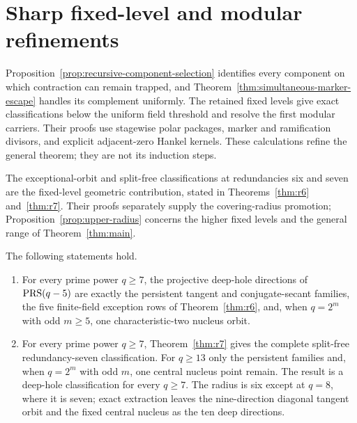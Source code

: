 \section{Sharp fixed-level and modular refinements}
\label{sec:fixed-level-roadmap}

Proposition~\ref{prop:recursive-component-selection} identifies every
component on which contraction can remain trapped, and
Theorem~\ref{thm:simultaneous-marker-escape} handles its complement uniformly.
The retained fixed levels give exact classifications below the uniform field
threshold and resolve the first modular carriers.  Their proofs use stagewise polar
packages, marker and ramification divisors, and explicit adjacent-zero Hankel
kernels.  These calculations refine the general theorem; they are not its
induction steps.

The exceptional-orbit and split-free classifications at redundancies six and
seven are the fixed-level geometric contribution, stated in
Theorems~\ref{thm:r6} and~\ref{thm:r7}.  Their proofs separately supply the
covering-radius promotion; Proposition~\ref{prop:upper-radius} concerns the
higher fixed levels and the general range of Theorem~\ref{thm:main}.

\begin{theorem}
\label{thm:spine}%
%
%
%
The following statements hold.
\begin{enumerate}[label=\textup{(\alph*)}]
\item For every prime power $q\geq7$, the projective deep-hole
      directions of $\operatorname{PRS}(q-5)$ are exactly the persistent tangent and
      conjugate-secant families, the five finite-field exception rows of
      Theorem~\ref{thm:r6}, and, when $q=2^m$ with odd $m\geq5$, one
      characteristic-two nucleus orbit.
\item For every prime power $q\geq7$, Theorem~\ref{thm:r7} gives the
      complete split-free redundancy-seven classification.  For $q\geq13$
      only the persistent families and, when $q=2^m$ with odd $m$, one
      central nucleus point remain.  The result is a deep-hole classification
      for every $q\geq7$.  The radius is six except at $q=8$, where it is
      seven; exact extraction
      leaves the nine-direction diagonal tangent orbit and the fixed central
      nucleus as the ten deep directions.
\end{enumerate}
\end{theorem}

